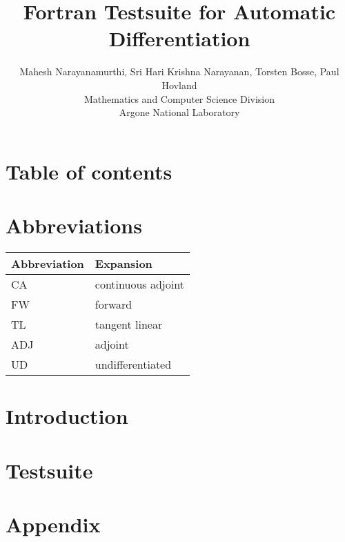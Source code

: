 \documentclass[conference,english]{article}
\begin{document}
\title{Fortran Testsuite for Automatic Differentiation}
\author{Mahesh Narayanamurthi, Sri Hari Krishna Narayanan, Torsten Bosse, Paul Hovland\\
Mathematics and Computer Science Division\\
Argone National Laboratory\\
}
\maketitle
\clearpage
\section*{Table of contents}
\tableofcontents
\lstlistoflistings
\clearpage
\section{Abbreviations}
\begin{table}[h]
\centering
\label{abbr_table}
\begin{tabular}{@{}|l|l|@{}}
\hline
\textbf{Abbreviation} & \textbf{Expansion}      \\ \hline
CA           & continuous adjoint \\ \hline
FW           & forward \\ \hline
TL           & tangent linear \\ \hline
ADJ           & adjoint \\ \hline
UD           & undifferentiated \\ \hline
\end{tabular}
\end{table}
\clearpage
\section{Introduction}
\clearpage
\section{Testsuite}
\clearpage
\clearpage 
 \clearpage

\section{Appendix}
\end{document}
